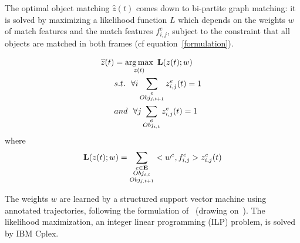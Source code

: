 The optimal object matching $\widehat{z}(t)$ comes down to bi-partite graph matching: it is solved by maximizing a likelihood function $L$ which depends on the weights $w$ of match features and the match features $f^e_{i, j}$, subject to the constraint that all objects are matched in both frames (cf equation~\ref{formulation}).

\begin{align}
\widehat{z}(t) & = \operatorname*{arg\,max}_{\substack{z(t)}}~ \mathbf{L}(z(t) ; w) \\
 & s.t.\ \ \forall i \sum_{\substack{e\\Obj_{j, t+1}}} z^{e}_{i, j}(t) = 1\ \\ 
 & and\ \ \forall j \sum_{\substack{e\\Obj_{i, t}}} z^{e}_{i, j}(t) = 1
\label{formulation}
\end{align}
where 
\begin{equation*}
\mathbf{L}(z(t) ; w) = \sum_{\substack{e\in \mathbf{E}\\Obj_{i, t}\\Obj_{j, t+1}}} <w^e, f^e_{i, j}> z^{e}_{i, j}(t)\\
\end{equation*}

The weights $w$ are learned by a structured support vector machine using annotated trajectories, following the formulation of~\cite{lou} (drawing on~\cite{Tsochantaridis}). The likelihood maximization, an integer linear programming (ILP) problem, is solved by IBM Cplex.

